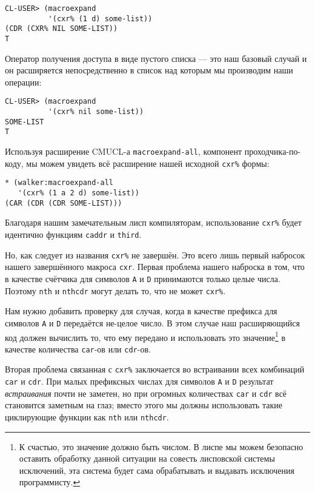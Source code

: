 \begin{verbatim}
CL-USER> (macroexpand
          '(cxr% (1 d) some-list))
(CDR (CXR% NIL SOME-LIST))
T
\end{verbatim}

Оператор получения доступа в виде пустого списка --- это наш базовый случай и он расширяется непосредственно в список над которым мы производим наши операции:

\begin{verbatim}
CL-USER> (macroexpand
          '(cxr% nil some-list))
SOME-LIST
T
\end{verbatim}

Используя расширение CMUCL-а \verb"macroexpand-all", компонент про\-ход\-чи\-ка-по-ко\-ду, мы можем увидеть всё расширение нашей исходной \verb"cxr%" формы:

\begin{verbatim}
* (walker:macroexpand-all
   '(cxr% (1 a 2 d) some-list))
(CAR (CDR (CDR SOME-LIST)))
\end{verbatim}

Благодаря нашим замечательным лисп компиляторам, использование \verb"cxr%" будет идентично функциям \verb"caddr" и \verb"third".

Но, как следует из названия \verb"cxr%" не завершён. Это всего лишь первый набросок нашего завершённого макроса \verb"cxr". Первая проблема нашего наброска в том, что в качестве счётчика для символов \verb"A" и \verb"D" принимаются только целые числа. Поэтому \verb"nth" и \verb"nthcdr" могут делать то, что не может \verb"cxr%".

Нам нужно добавить проверку для случая, когда в качестве префикса для символов \verb"A" и \verb"D" передаётся не-целое число. В этом случае наш расширяющийся код должен вычислить то, что ему передано и использовать это значение\footnote{К счастью, это значение должно быть числом. В лиспе мы можем безопасно оставить обработку данной ситуации на совесть лисповской системы исключений, эта система будет сама обрабатывать и выдавать исключения программисту.} в качестве количества \verb"car"-ов или \verb"cdr"-ов.



Вторая проблема связанная с \verb"cxr%" заключается во встраивании всех комбинаций \verb"car" и \verb"cdr". При малых префиксных числах для символов \verb"A" и \verb"D" результат \emph{встраивания} почти не заметен, но при огромных количествах \verb"car" и \verb"cdr" всё становится заметным на глаз; вместо этого мы должны использовать такие циклирующие функции как \verb"nth" или \verb"nthcdr".

